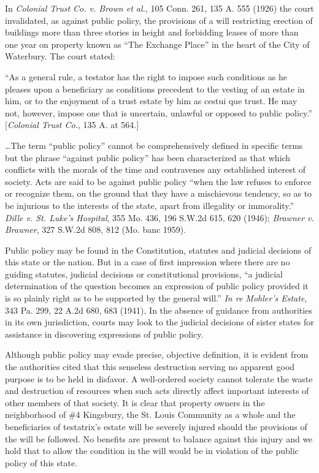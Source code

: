In \textit{Colonial Trust Co. v. Brown et al.}, 105 Conn. 261, 135 A. 555 (1926)
the court invalidated, as against public policy, the provisions of a will
restricting erection of buildings more than three stories in height and
forbidding leases of more than one year on property known as ``The Exchange
Place'' in the heart of the City of Waterbury. The court stated:

``As a general rule, a testator has the right to impose such conditions as he
pleases upon a beneficiary as conditions precedent to the vesting of an estate
in him, or to the enjoyment of a trust estate by him as cestui que trust. He
may not, however, impose one that is uncertain, unlawful or opposed to public
policy.'' [\textit{Colonial Trust Co.}, 135 A. at 564.] 

\ldots The term ``public policy'' cannot be comprehensively defined in specific
terms but the phrase ``against public policy'' has been characterized as that
which conflicts with the morals of the time and contravenes any established
interest of society. Acts are said to be against public policy ``when the law
refuses to enforce or recognize them, on the ground that they have a
mischievous tendency, so as to be injurious to the interests of the state,
apart from illegality or immorality.'' \textit{Dille v. St. Luke's Hospital},
355 Mo. 436, 196 S.W.2d 615, 620 (1946); \textit{Brawner v. Brawner}, 327
S.W.2d 808, 812 (Mo. banc 1959).

Public policy may be found in the Constitution, statutes and judicial decisions
of this state or the nation. But in a case of first impression where there are
no guiding statutes, judicial decisions or constitutional provisions, ``a
judicial determination of the question becomes an expression of public policy
provided it is so plainly right as to be supported by the general will.''
\textit{In re Mohler's Estate}, 343 Pa. 299, 22 A.2d 680, 683 (1941). In the
absence of guidance from authorities in its own jurisdiction, courts may look
to the judicial decisions of sister states for assistance in discovering
expressions of public policy.

Although public policy may evade precise, objective definition, it is evident
from the authorities cited that this senseless destruction serving no apparent
good purpose is to be held in disfavor. A well-ordered society cannot tolerate
the waste and destruction of resources when such acts directly affect important
interests of other members of that society. It is clear that property owners in
the neighborhood of \#4 Kingsbury, the St. Louis Community as a whole and the
beneficiaries of testatrix's estate will be severely injured should the
provisions of the will be followed. No benefits are present to balance against
this injury and we hold that to allow the condition in the will would be in
violation of the public policy of this state.

